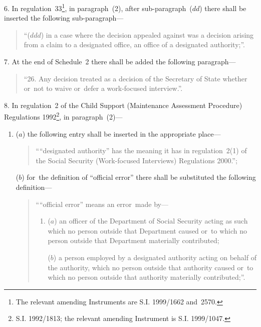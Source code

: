 \documentclass[12pt,a4paper]{article}
\begin{document}
\medskip

6.  In regulation~33\footnote{\frenchspacing The relevant amending Instruments are S.I. 1999/1662 and~2570.}, in paragraph~(2), after sub-paragraph~($dd$)  there shall be inserted the following sub-paragraph—
\begin{quotation}
“($ddd$) in a case where the decision appealed against was a decision arising from a claim to a designated office, an office of a designated authority;”.
\end{quotation}

\medskip

7.  At the end of Schedule~2 there shall be added the following paragraph—
\begin{quotation}
“26.  Any decision treated as a decision of the Secretary of State whether or~not to waive or~defer a work-focused interview.”.
\end{quotation}

\medskip

8.  In regulation~2 of the Child Support (Maintenance Assessment Procedure) Regulations 1992\footnote{\frenchspacing S.I. 1992/1813; the relevant amending Instrument is S.I. 1999/1047.}, in paragraph~(2)—
\begin{enumerate}\item[]
($a$) the following entry shall be inserted in the appropriate place—
\begin{quotation}
    ““designated authority” has the meaning it has in regulation~2(1) of the Social Security (Work-focused Interviews) Regulations 2000.”; 
\end{quotation}

($b$) for~the definition of “official error” there shall be substituted the following definition—
\begin{quotation}
    ““official error” means an error~made by—
\begin{enumerate}\item[]
    ($a$) 
    an officer of the Department of Social Security acting as such which no person outside that Department caused or~to which no person outside that Department materially contributed;

    ($b$) 
    a person employed by a designated authority acting on behalf of the authority, which no person outside that authority caused or~to which no person outside that authority materially contributed;”. 
\end{enumerate}
\end{quotation}
\end{enumerate}
\end{document}
